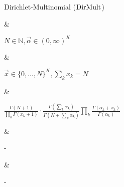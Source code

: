 Dirichlet-Multinomial ($\operatorname{DirMult}$)

&

$N \in \mathbb N, \vec \alpha \in (0, \infty)^K$

& 

$\vec x \in \{0, \dotsc, N\}^K, \sum_k x_k = N$

&

\(\displaystyle
	\frac{\Gamma(N + 1)}{\prod_k \Gamma(x_k + 1)} \cdot \frac{\Gamma\left(\sum_k \alpha_k\right)}{\Gamma\left(N + \sum_k \alpha_k\right)} \prod_k \frac{\Gamma(\alpha_k + x_k)}{\Gamma(\alpha_k)}
\)

& 

-

&

-